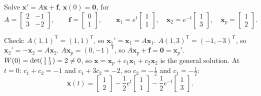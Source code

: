 \documentclass[10pt]{scrartcl}
\newcommand{\vv}[1]{\mathbf{#1}}
\begin{document}
\begin{example*}
  Solve $\vv x'=A\vv x+\vv f$, $\vv x(0)=\vv 0$, for
  \[
    A=\begin{bmatrix}2&-1\\3&-2\end{bmatrix},\qquad \vv f=\begin{bmatrix}0\\1\end{bmatrix},\qquad
    \vv x_1=e^{t}\begin{bmatrix}1\\1\end{bmatrix},\quad \vv x_2=e^{-t}\begin{bmatrix}1\\3\end{bmatrix},\quad \vv x_p=\begin{bmatrix}1\\2\end{bmatrix}.
  \]
  \begin{steps}
    \ii Check: $A(1,1)^{\mathsf T}=(1,1)^{\mathsf T}$, so $\vv x_1'=\vv x_1=A\vv x_1$. $A(1,3)^{\mathsf T}=(-1,-3)^{\mathsf T}$, so $\vv x_2'=-\vv x_2=A\vv x_2$. $A\vv x_p=(0,-1)^{\mathsf T}$, so $A\vv x_p+\vv f=\vv 0=\vv x_p'$.
    \ii $W(0)=\det\begin{psmallmatrix}1&1\\1&3\end{psmallmatrix}=2\neq 0$, so $\vv x=\vv x_p+c_1\vv x_1+c_2\vv x_2$ is the general solution.
    \ii At $t=0$: $c_1+c_2=-1$ and $c_1+3c_2=-2$, so $c_2=-\tfrac12$ and $c_1=-\tfrac12$:
    \[
      \vv x(t)=\begin{bmatrix}1\\2\end{bmatrix}-\frac12e^{t}\begin{bmatrix}1\\1\end{bmatrix}-\frac12e^{-t}\begin{bmatrix}1\\3\end{bmatrix}.
    \]
  \end{steps}
\end{example*}
\end{document}
